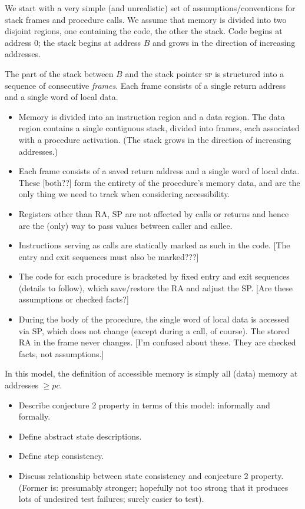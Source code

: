 \documentclass[conference]{IEEEtran}
\begin{document}
We start with a very simple (and unrealistic) set of assumptions/conventions for stack frames and procedure calls.
We assume that memory is divided into two disjoint regions, one containing the code, the other the stack.
Code begins at address 0; the stack begins at address $B$ and grows in the direction of increasing addresses.

The part of the stack between $B$ and the stack pointer \textsc{sp} is structured into a sequence of consecutive
\emph{frames}. Each frame consists of a single return address and a single word of local data.

  \begin {itemize}
  \item Memory is divided into an instruction region and a data region. The data region contains a single contiguous stack, divided into frames, each associated with a procedure activation. (The stack grows in the direction of increasing addresses.)
  \item Each frame consists of a saved return address and a single word of local data. These [both??] form the entirety of the procedure's memory data, and are the only thing we need to track when considering accessibility.
  \item Registers other than RA, SP are not affected by calls or returns and hence are the (only) way to pass values between caller and callee.
  \item Instructions serving as calls are statically marked as such in the code. [The entry and exit sequences must also be marked???]
  \item The code for each procedure is bracketed by fixed entry and exit sequences (details to follow), which save/restore the RA and
    adjust the SP. [Are these assumptions or checked facts?]
  \item During the body of the procedure, the single word of local data is accessed via SP, which does not change (except during a call, of course).  The stored RA in the frame never changes. [I'm confused about these. They are checked facts, not assumptions.]
  \end {itemize}
  In this model, the definition of accessible memory is simply all (data) memory at addresses $\geq pc$.
\begin{itemize}
\item
  Describe conjecture 2 property in terms of this model: informally and formally.
\item
  Define abstract state descriptions.
\item
  Define step consistency.
\item
  Discuss relationship between state consistency and conjecture 2 property.  (Former is: presumably stronger; hopefully not
  too strong that it produces lots of undesired test failures; surely easier to test).

\end{itemize}
\end{document}
